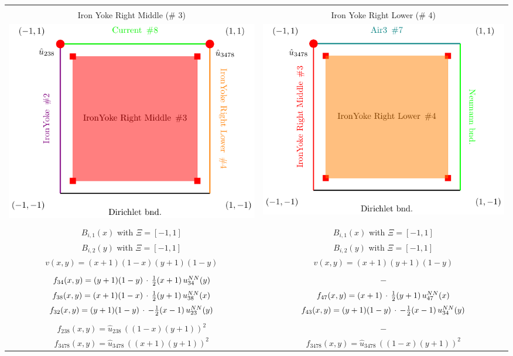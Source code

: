 \documentclass[12pt]{article}
\begin{document}
%
\begin{tabular}{c|c}
		\hline \hline \\[-1.25ex]
		Iron Yoke Right Middle (\# 3) & Iron Yoke Right Lower (\# 4) \\
		\hline
		\hline
		\includegraphics[width=0.5 \linewidth]{./standalones/IronYoke_Right_Middle.pdf} 
		&
		\includegraphics[width=0.5 \linewidth]{./standalones/IronYoke_Right_lower.pdf}		 
		\\
		\hline \\[-0.75ex]
		$B_{i,1}(x)$ with $\Xi = \left[-1,1\right]$ 
		& 
		$B_{i,1}(x)$ with $\Xi = \left[-1,1\right]$
		\\ [0.75ex]
		$B_{i,2}(y)$ with $\Xi = \left[-1,1\right]$
		& 
		$B_{i,2}(y)$ with $\Xi = \left[-1,1\right]$
		\\ [0.75ex]
		$v(x,y)=(x+1)(1-x)(y+1)(1-y)$ 
		&
		$v(x,y)=(x+1)(y+1)(1-y)$
		\\ [0.75ex]
		\hline
		\\ [-0.75ex]
		$f_{34}(x,y)= (y+1)(1-y) \, \cdot \, \frac{1}{2}(x+1) \,u^{\tiny NN}_{34}(y)$ 
		&
		$-$ 
		\\
		$f_{38}(x,y)= (x+1)(1-x) \, \cdot \, \frac{1}{2}(y+1) \,u^{\tiny NN}_{38}(x)$ 
		&
		$f_{47}(x,y)= (x+1) \, \cdot \, \frac{1}{2}(y+1) \,u^{\tiny NN}_{47}(x)$ 
		\\
		$f_{32}(x,y)= (y+1)(1-y) \, \cdot \, -\frac{1}{2}(x-1) \,u^{\tiny NN}_{23}(y)$ 
		&
		$f_{43}(x,y)= (y+1)(1-y) \, \cdot \, -\frac{1}{2}(x-1)\,u^{\tiny NN}_{34}(y)$ 
		\\ [0.75ex]
		\hline 
		\\ [-0.75ex]
		$f_{238}(x,y)=\hat{u}_{238}\,((1-x)(y+1))^2$ 
		&
		$-$
		\\
		$f_{3478}(x,y)=\hat{u}_{3478}\,((x+1)(y+1))^2$ 
		&
		$f_{3478}(x,y)=\hat{u}_{3478}\,((1-x)(y+1))^2$
		\\
		\hline
		\hline

\end{tabular}
\end{document}
